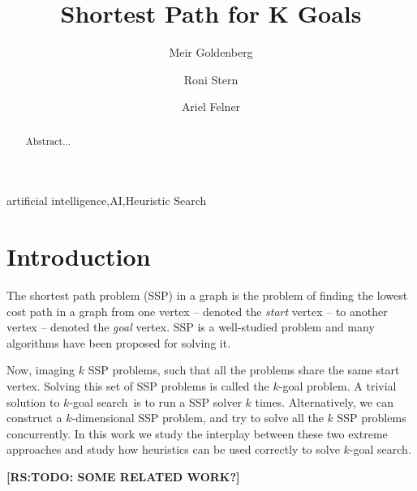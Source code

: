 \documentclass{aicom2e}
\newcommand{\kgs}{$k$-goal search}
\newcommand{\roni}[1]{\textbf{[RS:#1]}}
\begin{document}
\begin{frontmatter}                           %
%
\title{Shortest Path for K Goals}
\maketitle
%
\author[]{Meir Goldenberg}
\address{Lev Academic Center\\ Jerusalem, Israel\\
	E-mail: mgoldenbe@gmail.com}
\author[]{Roni Stern}
\address{Ben Gurion University of the Negev\\ Be'er Sheva, Israel\\
E-mail: roni.stern@gmail.com}
\author[]{Ariel Felner}
\address{Ben Gurion University of the Negev\\ Be'er Sheva, Israel\\
	E-mail: felner@bgu.ac.il}

\begin{abstract}
Abstract...

\end{abstract}

\begin{keyword}
artificial intelligence\sep AI\sep Heuristic Search
\end{keyword}
%
\end{frontmatter}

\section*{Introduction}


The shortest path problem (SSP) in a graph is the problem of finding the lowest cost path in a graph from one vertex -- denoted the {\em start} vertex -- to another vertex -- denoted the {\em goal} vertex. 
SSP is a well-studied problem and many algorithms have been proposed for solving it. 

Now, imaging $k$ SSP problems, such that all the problems share the same start vertex. 
Solving this set of SSP problems is called the $k$-goal problem. 
A trivial solution to \kgs\ is to run a SSP solver $k$ times. Alternatively, 
we can construct a $k$-dimensional SSP problem, and try to solve all the $k$ SSP problems concurrently. 
In this work we study the interplay between these two extreme approaches and
study how heuristics can be used correctly to solve \kgs. 


\roni{TODO: SOME RELATED WORK?}
\end{document}
